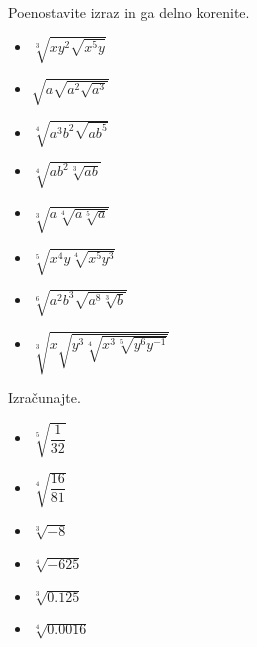         
                ~\\~\\~


        
            \begin{naloga}
                Poenostavite izraz in ga delno korenite.
                \begin{multicols}{2}
                    \begin{itemize}
                        \item $\displaystyle \sqrt[3]{xy^2\sqrt{x^5y}}$ 
                        \item $\displaystyle \sqrt{a\sqrt{a^2\sqrt{a^3}}}$ 
                        \item $\displaystyle \sqrt[4]{a^3b^2\sqrt{ab^5}}$ 
                        \item $\displaystyle \sqrt[4]{ab^2\sqrt[3]{ab}}$ 
                        \item $\displaystyle \sqrt[3]{a\sqrt[4]{a\sqrt[5]{a}}}$ 
                        \item $\displaystyle \sqrt[5]{x^4y\sqrt[4]{x^5y^3}}$ 
                        \item $\displaystyle \sqrt[6]{a^2b^3\sqrt{a^8\sqrt[3]{b}}}$    
                        \item $\displaystyle \sqrt[3]{x\sqrt{y^3\sqrt[4]{x^3\sqrt[5]{y^6y^{-1}}}}}$                  
                    \end{itemize}
                \end{multicols}
            \end{naloga}
        


        
            \begin{naloga}
                Izračunajte.
                \begin{multicols}{2}
                    \begin{itemize}
                        \item $\displaystyle \sqrt[5]{\dfrac{1}{32}}$ 
                        \item $\displaystyle \sqrt[4]{\dfrac{16}{81}}$ 
                        \item $\displaystyle \sqrt[3]{-8}$ 
                        \item $\displaystyle \sqrt[4]{-625}$ 
                        \item $\displaystyle \sqrt[3]{0.125}$ 
                        \item $\displaystyle \sqrt[4]{0.0016}$ 
                    \end{itemize}
                \end{multicols}
            \end{naloga}
        
